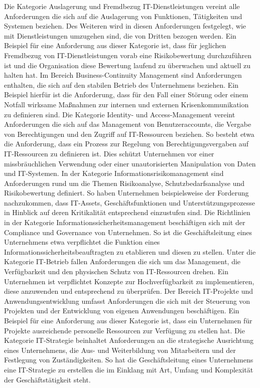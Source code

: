 Die Kategorie \glqq{}Auslagerung und Fremdbezug IT-Dienstleistungen\grqq{} vereint alle Anforderungen die sich auf die Auslagerung von Funktionen, Tätigkeiten und Systemen beziehen. Des Weiteren wird in diesen Anforderungen festgelegt, wie mit Dienstleistungen umzugehen sind, die von Dritten bezogen werden. Ein Beispiel für eine Anforderung aus dieser Kategorie ist, dass für jeglichen Fremdbezug von IT-Dienstleistungen vorab eine Risikobewertung durchzuführen ist und die Organisation diese Bewertung laufend zu überwachen und aktuell zu halten hat. Im Bereich \glqq{}Business-Continuity Management\grqq{} sind Anforderungen enthalten, die sich auf den stabilen Betrieb des Unternehmens beziehen. Ein Beispiel hierfür ist die Anforderung, dass für den Fall einer Störung oder einem Notfall wirksame Maßnahmen zur internen und externen Krisenkommunikation zu definieren sind.
\bigbreak
Die Kategorie \glqq{}Identity- und Access-Management\grqq{} vereint Anforderungen die sich auf das Management von Benutzeraccounts, die Vergabe von Berechtigungen und den Zugriff auf IT-Ressourcen beziehen. So besteht etwa die Anforderung, dass ein Prozess zur Regelung von Berechtigungsvergaben auf IT-Ressourcen zu definieren ist. Dies schützt Unternehmen vor einer missbräuchlichen Verwendung oder einer unautorisierten Manipulation von Daten und IT-Systemen. In der Kategorie \glqq{}Informationsrisikomanagement\grqq{} sind Anforderungen rund um die Themen Risikoanalyse, Schutzbedarfsanalyse und Risikobewertung definiert. So haben Unternehmen beispielsweise der Forderung nachzukommen, dass IT-Assets, Geschäftsfunktionen und Unterstützungsprozesse in Hinblick auf deren Kritikalität entsprechend einzustufen sind. 
\bigbreak
Die Richtlinien in der Kategorie \glqq{}Informationssicherheitsmanagement\grqq{} beschäftigen sich mit der Compliance und Governance von Unternehmen. So ist die Geschäftsleitung eines Unternehmens etwa verpflichtet die Funktion eines Informationssicherheitsbeauftragten zu etablieren und diesen zu stellen. Unter die Kategorie \glqq{}IT-Betrieb\grqq{} fallen Anforderungen die sich um das Management, die Verfügbarkeit und den physischen Schutz von IT-Ressourcen drehen. Ein Unternehmen ist verpflichtet Konzepte zur Hochverfügbarkeit zu implementieren, diese anzuwenden und entsprechend zu überprüfen. 
\bigbreak
Der Bereich \glqq{}IT-Projekte und Anwendungsentwicklung\grqq{} umfasst Anforderungen die sich mit der Steuerung von Projekten und der Entwicklung von eigenen Anwendungen beschäftigen. Ein Beispiel für eine Anforderung aus dieser Kategorie ist, dass ein Unternehmen für Projekte ausreichende personelle Ressourcen zur Verfügung zu stellen hat. Die Kategorie \glqq{}IT-Strategie\grqq{} beinhaltet Anforderungen an die strategische Ausrichtung eines Unternehmens, die Aus- und Weiterbildung von Mitarbeitern und der Festlegung von Zuständigkeiten. So hat die Geschäftsleitung eines Unternehmens eine IT-Strategie zu erstellen die im Einklang mit Art, Umfang und Komplexität der Geschäftstätigkeit steht. 

